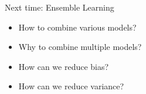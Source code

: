 \documentclass{beamer}
\begin{document}
\begin{frame}{Next time: Ensemble Learning}
\begin{itemize}
	\item How to combine various models?
	\item Why to combine multiple models?
	\item How can we reduce bias?
	\item How can we reduce variance?
\end{itemize}
\end{frame}

\end{document}
